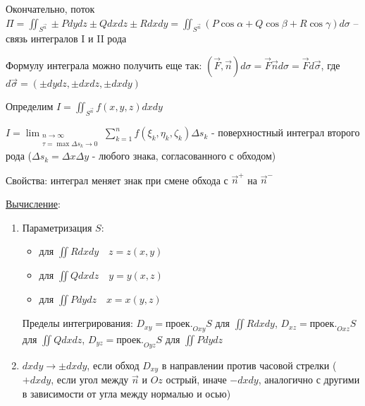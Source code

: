 \documentclass[12pt]{article}
\begin{document}
\begin{enumerate}[label*=\textbf{\arabic** }]
    \hypertarget{connectionbetweensurfaceintegral}{}

    Окончательно, поток $\Pi = \iint_{S^{\vec{n}}} \pm Pdydz \pm Qdxdz \pm Rdxdy = \iint_{S^{\vec{n}}} (P\cos\alpha + Q\cos\beta + R\cos\gamma) d\sigma$ -- связь интегралов I и II рода

    \Nota Формулу интеграла можно получить еще так: $(\vec{F}, \vec{n})d\sigma = \vec{F}\vec{n}d\sigma = \vec{F}d\vec{\sigma}$, где $d\vec{\sigma} = (\pm dydz, \pm dxdz, \pm dxdy)$

    \hypertarget{surfaceintegralofsecondkindmath}{}


    Определим $I = \iint_{S^{\overrightarrow{n}}} f(x, y, z) dxdy$

    $I = \lim_{\substack{n \to \infty \\ \tau = \max \Delta s_k \to 0}} \sum_{k=1}^n f(\xi_k, \eta_k, \zeta_k) \Delta s_k$ - поверхностный интеграл второго рода
    ($\Delta s_k = \Delta x\Delta y$ - любого знака, согласованного с обходом)

    \hypertarget{surfaceintegralofsecondkindproperties}{}

    Свойства: интеграл меняет знак при смене обхода с $\vec{n}^+$ на $\vec{n}^-$

    \hypertarget{surfaceintegralofsecondkindcalculation}{}

    \underline{Вычисление}:

    \begin{enumerate}
        \item Параметризация $S$:
        
        \begin{itemize}
            \item для $\iint Rdxdy \quad z = z(x, y)$
            
            \item для $\iint Qdxdz \quad y = y(x, z)$

            \item для $\iint Pdydz \quad x = x(y, z)$
        \end{itemize}

        Пределы интегрирования: $D_{xy} = \text{проек.}_{Oxy} S$ для $\iint Rdxdy$, $D_{xz} = \text{проек.}_{Oxz} S$ для $\iint Qdxdz$, $D_{yz} = \text{проек.}_{Oyz} S$ для $\iint Pdydz$

        \item $dxdy \to \pm dxdy$, если обход $D_{xy}$ в направлении против часовой стрелки ($+dxdy$, если угол между $\vec{n}$ и $Oz$ острый, иначе $-dxdy$, аналогично с другими в зависимости от угла между нормалью и осью)


\end{enumerate}
\end{enumerate}
\end{document}
